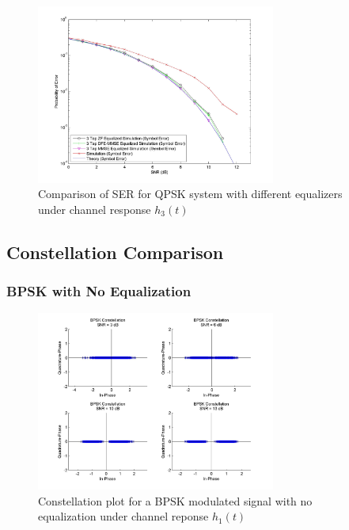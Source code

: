 \documentclass[]{article}
\begin{document}
\begin{figure}[H]
\centering
\includegraphics[width=0.7\textwidth]{qpSNR3.jpg}
\caption{Comparison of SER for QPSK system with different equalizers under channel response $h_3(t)$}
\end{figure}

\newpage
\subsection{Constellation Comparison}
\label{sec:constCompare}

\subsubsection{BPSK with No Equalization}

\begin{figure}[H]
\centering
\includegraphics[width=0.7\textwidth]{bpConst1.jpg}
\caption{Constellation plot for a BPSK modulated signal with no equalization under channel reponse $h_1(t)$}
\end{figure}
\end{document}
